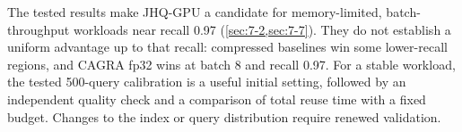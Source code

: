 The tested results make JHQ-GPU a candidate for memory-limited,
batch-throughput workloads near recall 0.97 (\cref{sec:7-2,sec:7-7}).
They do not establish a uniform advantage up to that recall: compressed
baselines win some lower-recall regions, and CAGRA fp32 wins at batch 8
and recall 0.97. For a stable workload, the tested 500-query calibration
is a useful initial setting, followed by an independent quality check
and a comparison of total reuse time with a fixed budget. Changes to
the index or query distribution require renewed validation.

